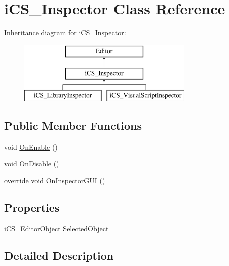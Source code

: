 \hypertarget{classi_c_s___inspector}{\section{i\+C\+S\+\_\+\+Inspector Class Reference}
\label{classi_c_s___inspector}
}
Inheritance diagram for i\+C\+S\+\_\+\+Inspector\+:\begin{figure}[H]
\begin{center}
\leavevmode
\includegraphics[height=3.000000cm]{classi_c_s___inspector}
\end{center}
\end{figure}
\subsection*{Public Member Functions}
\begin{DoxyCompactItemize}
\item 
void \hyperlink{classi_c_s___inspector_a61bbda8968db8404497e47861cdda6b0}{On\+Enable} ()
\item 
void \hyperlink{classi_c_s___inspector_a9f881b0413ec546b698fc73e6d615094}{On\+Disable} ()
\item 
override void \hyperlink{classi_c_s___inspector_a147761aaede97cc5ed53db6699e91329}{On\+Inspector\+G\+U\+I} ()
\end{DoxyCompactItemize}
\subsection*{Properties}
\begin{DoxyCompactItemize}
\item 
\hyperlink{classi_c_s___editor_object}{i\+C\+S\+\_\+\+Editor\+Object} \hyperlink{classi_c_s___inspector_a19eb71dfa9b870a3e2332122f8bbf0e1}{Selected\+Object}
\end{DoxyCompactItemize}


\subsection{Detailed Description}


